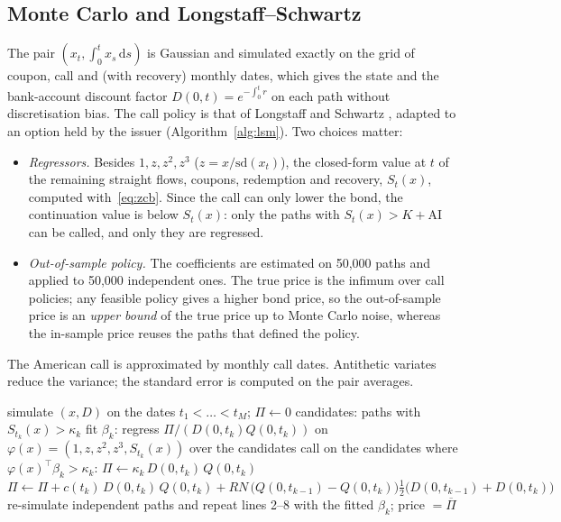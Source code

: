 \documentclass[11pt,a4paper]{article}
\newcommand{\dd}{\mathrm{d}}
\newcommand{\AI}{\mathrm{AI}}
\begin{document}
\subsection{Monte Carlo and Longstaff--Schwartz}
The pair $(x_t, \int_0^t x_s\,\dd s)$ is Gaussian and simulated exactly on the grid of coupon, call and (with
recovery) monthly dates, which gives the state and the bank-account discount factor $D(0,t) = e^{-\int_0^t r}$ on
each path without discretisation bias. The call policy is that of Longstaff and Schwartz \cite{longstaff2001},
adapted to an option held by the issuer (Algorithm~\ref{alg:lsm}). Two choices matter:
\begin{itemize}
\item \emph{Regressors.} Besides $1, z, z^2, z^3$ ($z = x/\mathrm{sd}(x_t)$), the closed-form value at $t$ of the
remaining straight flows, coupons, redemption and recovery, $S_t(x)$, computed with~\eqref{eq:zcb}. Since the call
can only lower the bond, the continuation value is below $S_t(x)$: only the paths with $S_t(x) > K + \AI$ can be
called, and only they are regressed.
\item \emph{Out-of-sample policy.} The coefficients are estimated on 50{,}000 paths and applied to 50{,}000
independent ones. The true price is the infimum over call policies; any feasible policy gives a higher bond price, so
the out-of-sample price is an \emph{upper bound} of the true price up to Monte Carlo noise, whereas the in-sample
price reuses the paths that defined the policy.
\end{itemize}
The American call is approximated by monthly call dates. Antithetic variates reduce the variance; the standard
error is computed on the pair averages.

\begin{algorithm}[h]
\caption{Longstaff--Schwartz for a callable bond (issuer's call)}
\label{alg:lsm}
\begin{algorithmic}[1]
\State simulate $(x, D)$ on the dates $t_1 < \dots < t_M$; \quad $\Pi \gets 0$ 
  \If{$t_k$ is a call date, strike $\kappa_k = K(t_k) + \AI(t_k)$}
    \State candidates: paths with $S_{t_k}(x) > \kappa_k$
    \State fit $\beta_k$: regress $\Pi / (D(0,t_k)Q(0,t_k))$ on $\varphi(x) = (1,z,z^2,z^3,S_{t_k}(x))$ over the candidates
    \State call on the candidates where $\varphi(x)^\top\beta_k > \kappa_k$: \quad $\Pi \gets \kappa_k\,D(0,t_k)\,Q(0,t_k)$
  \EndIf
  \State $\Pi \gets \Pi + c(t_k)\,D(0,t_k)\,Q(0,t_k) + RN\,\big(Q(0,t_{k-1}) - Q(0,t_k)\big)\tfrac12\big(D(0,t_{k-1}) + D(0,t_k)\big)$
\EndFor
\State re-simulate independent paths and repeat lines 2--8 with the fitted $\beta_k$; \quad price $= \overline{\Pi}$
\end{algorithmic}
\end{algorithm}
\end{document}
